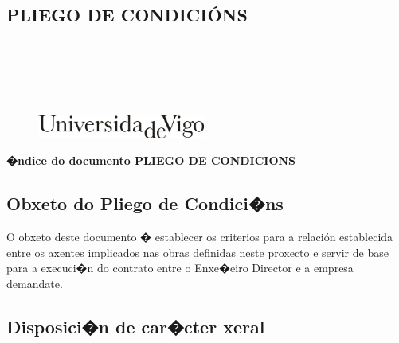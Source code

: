\documentclass[11pt,twoside]{book}
\begin{document}
\begin{center}
\begin{normalsize}
\begin{center}
\part{\bf{PLIEGO DE CONDICIÓNS}}\thispagestyle{empty}
\end{center}
\end{normalsize}
\ \\
\ \\
\ \\
\ \\

\begin{center}
\begin{figure}[htbp]
\begin{center}
\includegraphics[angle=0, height=0.8cm]{images/UVIGOLogo.png}
\end{center}
\end{figure}
\end{center}

\end{center}

\cleardoublepage


\pagestyle{fancy}
\startcontents[parts]
\begin{center}{\large \bf �ndice do documento PLIEGO DE CONDICIONS}\end{center}

{\hypersetup{hidelinks}}

\cleardoublepage

\chapter{Obxeto do Pliego de Condici�ns}

O obxeto deste documento � establecer os criterios para a relación establecida entre os axentes implicados nas obras definidas neste proxecto e servir de base para a execuci�n do contrato entre o Enxe�eiro Director e a empresa demandate.


\chapter{Disposici�n de car�cter xeral}
\end{document}
